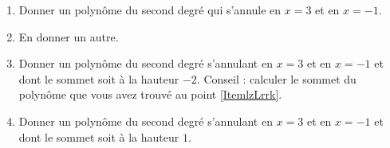 
\begin{exercice}\label{exoPremiere-0041}

    \begin{enumerate}
        \item\label{ItemlzLrrk}
            Donner un polynôme du second degré qui s'annule en \( x=3\) et en \( x=-1\). 
        \item
            En donner un autre.
        \item
            Donner un polynôme du second degré s'annulant en \( x=3\) et en \( x=-1\) et dont le sommet soit à la hauteur \( -2\). Conseil : calculer le sommet du polynôme que vous avez trouvé au point \ref{ItemlzLrrk}.
        \item
            Donner un polynôme du second degré s'annulant en \( x=3\) et en \( x=-1\) et dont le sommet soit à la hauteur \( 1\). 
    \end{enumerate}

\end{exercice}
